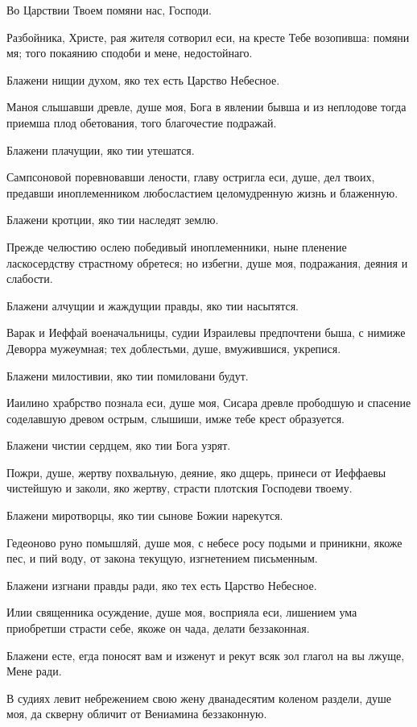 
Во Царствии Твоем помяни нас, Господи.

Разбойника, Христе, рая жителя сотворил еси, на кресте Тебе возопивша: помяни мя; того покаянию сподоби и мене, недостойнаго.

Блажени нищии духом, яко тех есть Царство Небесное.

Маноя слышавши древле, душе моя, Бога в явлении бывша и из неплодове тогда приемша плод обетования, того благочестие подражай.

Блажени плачущии, яко тии утешатся.

Сампсоновой поревновавши лености, главу остригла еси, душе, дел твоих, предавши иноплеменником любосластием целомудренную жизнь и блаженную.

Блажени кротции, яко тии наследят землю.

Прежде челюстию ослею победивый иноплеменники, ныне пленение ласкосердству страстному обретеся; но избегни, душе моя, подражания, деяния и слабости.

Блажени алчущии и жаждущии правды, яко тии насытятся.

Варак и Иеффай военачальницы, судии Израилевы предпочтени быша, с нимиже Деворра мужеумная; тех доблестьми, душе, вмужившися, укрепися.

Блажени милостивии, яко тии помиловани будут.

Иаилино храбрство познала еси, душе моя, Сисара древле прободшую и спасение соделавшую древом острым, слышиши, имже тебе крест образуется.

Блажени чистии сердцем, яко тии Бога узрят.

Пожри, душе, жертву похвальную, деяние, яко дщерь, принеси от Иеффаевы чистейшую и заколи, яко жертву, страсти плотския Господеви твоему.

Блажени миротворцы, яко тии сынове Божии нарекутся.

Гедеоново руно помышляй, душе моя, с небесе росу подыми и приникни, якоже пес, и пий воду, от закона текущую, изгнетением письменным.

Блажени изгнани правды ради, яко тех есть Царство Небесное.

Илии священника осуждение, душе моя, восприяла еси, лишением ума приобретши страсти себе, якоже он чада, делати беззаконная.

Блажени есте, егда поносят вам и изженут и рекут всяк зол глагол на вы лжуще, Мене ради.

В судиях левит небрежением свою жену дванадесятим коленом раздели, душе моя, да скверну обличит от Вениамина беззаконную.

